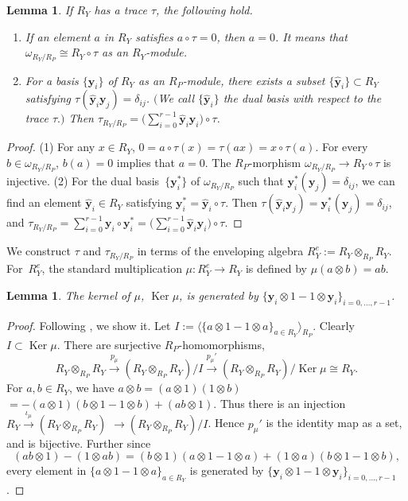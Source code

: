 \documentclass[pdftex]{sigma}
\def\bby{{\mathbf y}}
\def\hby{\widehat {{\mathbf y}}}
\def\Ker{\operatorname{Ker}}
\numberwithin{equation}{section}
\newtheorem{Lemma}[Theorem]{Lemma}
\begin{document}
\begin{Lemma}\label{2lm:trace_1.2}
If $R_Y$ has a trace $\tau$, the following hold.
\begin{enumerate}\itemsep=0pt
\item[$1.$] If an element $a$ in $R_Y$ satisfies $a \circ\tau =0$, then $a=0$.
It means that $\omega_{R_Y/R_P}\cong R_Y\circ \tau$ as an $R_Y$-module.

\item[$2.$] For a basis $\{\bby_i\}$ of $R_Y$ as an $R_P$-module, there exists a subset $\{\hby_i\}\subset R_Y$ satisfying $\tau(\hby_i \bby_j)=\delta_{i j}$.
$($We call $\{\hby_i\}$ the dual basis with respect to the trace $\tau.)$
Then $\tau_{R_Y/R_P}=\big(\sum_{i=0}^{r-1} \hby_i \bby_i\big)\circ \tau$.
\end{enumerate}
\end{Lemma}

\begin{proof}(1) For any $x\in R_Y$, $0=a\circ \tau(x)=\tau(ax)=x\circ \tau(a)$. For every $b \in \omega_{R_Y/R_P}$, $b(a)=0$ implies that $a=0$.
The $R_P$-morphism $\omega_{R_Y/R_P}\to R_Y\circ \tau$ is injective.
(2) For the dual basis~$\{\bby_i^*\}$ of $\omega_{R_Y/R_P}$ such that $\bby_i^*(\bby_j)=\delta_{i j}$, we can find an element $\hby_i\in R_Y$ satisfying $\bby^*_i = \hby_i\circ \tau$.
Then $\tau(\hby_i \bby_j)=\bby_i^*(\bby_j)=\delta_{i j}$, and $\tau_{R_Y/R_P}=\sum_{i=0}^{r-1}\bby_i\circ \bby_i^*=\big(\sum_{i=0}^{r-1} \hby_i \bby_i\big)\circ \tau$.
\end{proof}

We construct $\tau$ and $\tau_{R_Y/R_P}$ in terms of the enveloping algebra
$R_Y^e:=R_Y \otimes_{R_P}R_Y$.
For~$R_Y^e$, the standard multiplication $\mu\colon R_Y^e\to R_Y$ is defined by $\mu(a\otimes b)=ab$.

\begin{Lemma}The kernel of $\mu$, $\Ker \mu$, is generated by $\{\bby_i \otimes 1 - 1 \otimes \bby_i\}_{i=0, \dots, r-1}$.
\end{Lemma}

\begin{proof}
Following \cite[Theorem~G.7]{Kunz2004}, we show it.
Let $I:=\langle \{a \otimes 1 - 1 \otimes a\}_{a\in R_Y}\rangle_{R_P}$.
Clearly $I \subset \Ker \mu$.
There are surjective $R_P$-homomorphisms,
\[
R_Y \otimes_{R_P} R_Y \xrightarrow{p_\mu} (R_Y \otimes_{R_P} R_Y)/I
\xrightarrow{p_\mu'}
(R_Y \otimes_{R_P} R_Y)/\Ker \mu \cong R_Y.
\]
For $a, b \in R_Y$, we have
$a\otimes b=(a\otimes 1)(1\otimes b)$
$=-(a\otimes 1)(b\otimes 1 -1\otimes b)+(ab\otimes 1)$.
Thus there is an injection $R_Y\xrightarrow{\iota_\mu}(R_Y \otimes_{R_P} R_Y)$
$\to (R_Y \otimes_{R_P} R_Y)/I$.
Hence $p_\mu'$ is the identity map as a set, and is bijective.
Further since
\[
(ab\otimes 1)-(1\otimes ab)=
(b\otimes 1)(a\otimes 1 -1\otimes a)+
(1\otimes a)(b\otimes 1 - 1\otimes b),
\]
every element in $\{a \otimes 1 - 1 \otimes a\}_{a\in R_Y}$ is generated by
$\{\bby_i \otimes 1 - 1 \otimes \bby_i\}_{i=0, \dots, r-1}$.
\end{proof}
\end{document}
